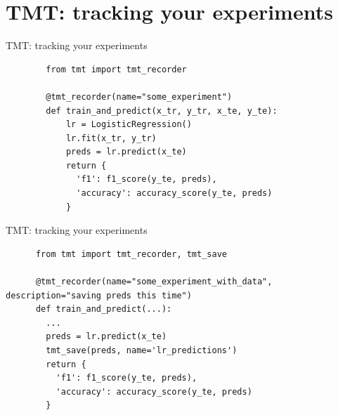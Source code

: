 \documentclass[aspectratio=169,xcolor={dvipsnames}]{beamer}
\begin{document}
  \section{TMT: tracking your experiments}
  \begin{frame}[fragile]{TMT: tracking your experiments}
      \begin{verbatim}
        from tmt import tmt_recorder

        @tmt_recorder(name="some_experiment")
        def train_and_predict(x_tr, y_tr, x_te, y_te):
            lr = LogisticRegression()
            lr.fit(x_tr, y_tr)
            preds = lr.predict(x_te)
            return {
              'f1': f1_score(y_te, preds),
              'accuracy': accuracy_score(y_te, preds)
            }
      \end{verbatim}
  \end{frame}
  \begin{frame}[fragile]{TMT: tracking your experiments}
    \begin{verbatim}
      from tmt import tmt_recorder, tmt_save

      @tmt_recorder(name="some_experiment_with_data", description="saving preds this time")
      def train_and_predict(...):
        ...
        preds = lr.predict(x_te)
        tmt_save(preds, name='lr_predictions')
        return {
          'f1': f1_score(y_te, preds),
          'accuracy': accuracy_score(y_te, preds)
        }
    \end{verbatim}
  \end{frame}
\end{document}

